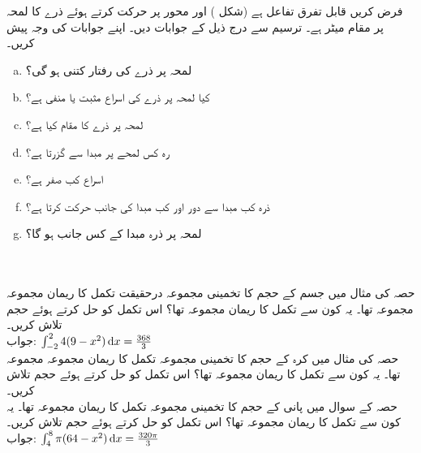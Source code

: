 فرض کریں  قابل تفرق تفاعل ہے (شکل ) اور محور پر حرکت کرتے ہوئے ذرے کا لمحہ  پر مقام  میٹر ہے۔ ترسیم سے درج ذیل کے جوابات دیں۔ اپنے جوابات کی وجہ پیش کریں۔
\begin{enumerate}[a.]
\item
لمحہ  پر ذرے کی رفتار کتنی ہو گی؟
\item
کیا لمحہ  پر ذرے کی اسراع مثبت یا منفی ہے؟
\item
لمحہ  پر ذرے کا مقام کیا ہے؟
\item
رہ کس لمحے پر مبدا سے گزرتا ہے؟
\item
اسراع کب صفر ہے؟
\item
 ذرہ کب مبدا سے دور اور کب مبدا کی جانب حرکت کرتا ہے؟
\item
لمحہ  پر ذرہ مبدا کے کس جانب ہو گا؟
\end{enumerate}
\\
\\
حصہ  کی مثال  میں جسم کے حجم کا تخمینی مجموعہ درحقیقت تکمل کا ریمان مجموعہ مجموعہ تھا۔ یہ کون سے تکمل کا ریمان مجموعہ تھا؟ اس تکمل کو حل کرتے ہوئے حجم تلاش کریں۔\\
جواب:\quad
$\int_{-2}^2 4(9-x^2)\dif x=\tfrac{368}{3}$
\\
حصہ  کی مثال  میں کرہ کے حجم کا تخمینی مجموعہ  تکمل کا ریمان مجموعہ مجموعہ تھا۔ یہ کون سے تکمل کا ریمان مجموعہ تھا؟ اس تکمل کو حل کرتے ہوئے حجم تلاش کریں۔  
\\
حصہ  کے سوال  میں پانی کے حجم کا تخمینی مجموعہ  تکمل کا ریمان مجموعہ تھا۔ یہ کون سے تکمل کا ریمان مجموعہ تھا؟ اس تکمل کو حل کرتے ہوئے حجم تلاش کریں۔\\
جواب:\quad
$\int_4^8\pi(64-x^2)\dif x=\tfrac{320\pi}{3}$
